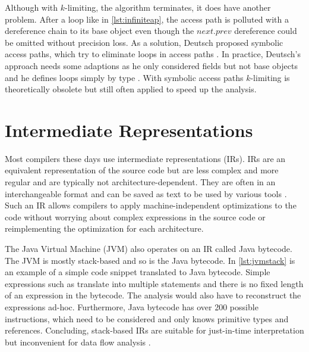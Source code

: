 \documentclass[../draft.tex]{subfiles}
\begin{document}
    Although with $k$-limiting, the algorithm terminates, it does have another problem. 
    After a loop like in \autoref{lst:infiniteap}, the access path is polluted with a dereference chain to its base object even though the $next.prev$ dereference could be omitted without precision loss. 
    As a solution, Deutsch proposed symbolic access paths, which try to eliminate loops in access paths \cite{Deutsch1994}. 
    In practice, Deutsch's approach needs some adaptions as he only considered fields but not base objects and he defines loops simply by type \cite{Arzt2017PhD}. 
    With symbolic access paths $k$-limiting is theoretically obsolete but still often applied to speed up the analysis.

    \section{Intermediate Representations}\label{s:jimple}
    Most compilers these days use intermediate representations (IRs). 
    IRs are an equivalent representation of the source code but are less complex and more regular and are typically not architecture-dependent. 
    They are often in an interchangeable format and can be saved as text to be used by various tools \cite{Thain2019}.
    Such an IR allows compilers to apply machine-independent optimizations to the code without worrying about complex expressions in the source code or reimplementing the optimization for each architecture. 

    The Java Virtual Machine (JVM) also operates on an IR called Java bytecode. 
    The JVM is mostly stack-based and so is the Java bytecode. 
    In \autoref{lst:jvmstack} is an example of a simple code snippet translated to Java bytecode. 
    Simple expressions such as  translate into multiple statements and there is no fixed length of an expression in the bytecode. 
    The analysis would also have to reconstruct the expressions ad-hoc. 
    Furthermore, Java bytecode has over 200 possible instructions\footnotemark{}, which need to be considered and only knows primitive types and references. 
    Concluding, stack-based IRs are suitable for just-in-time interpretation but inconvenient for data flow analysis \cite{Valleerai2004}.
\end{document}

